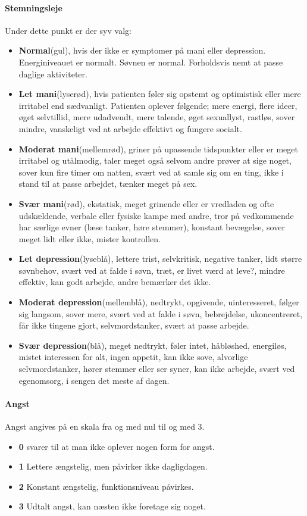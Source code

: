 \paragraph{Stemningsleje}
Under dette punkt er der syv valg:
\begin{itemize}
	\item \textbf{Normal}(gul), hvis der ikke er symptomer på mani eller depression. Energiniveauet er normalt. Søvnen er normal. Forholdsvis nemt at passe daglige aktiviteter.
	\item \textbf{Let mani}(lyserød), hvis patienten føler sig opstemt og optimistisk eller mere irritabel end sædvanligt. Patienten oplever følgende; mere energi, flere ideer, øget selvtillid, mere udadvendt, mere talende, øget sexuallyst, rastløs, sover mindre, vanskeligt ved at arbejde effektivt og fungere socialt.
	\item \textbf{Moderat mani}(mellemrød), griner på upassende tidspunkter eller er meget irritabel og utålmodig, taler meget også selvom andre prøver at sige noget, sover kun fire timer om natten, svært ved at samle sig om en ting, ikke i stand til at passe arbejdet, tænker meget på sex.
	\item \textbf{Svær mani}(rød), ekstatisk, meget grinende eller er vredladen og ofte udskældende, verbale eller fysiske kampe med andre, tror på vedkommende har særlige evner (læse tanker, høre stemmer), konstant bevægelse, sover meget lidt eller ikke, mister kontrollen.
	\item \textbf{Let depression}(lyseblå), lettere trist, selvkritisk, negative tanker, lidt større søvnbehov, svært ved at falde i søvn, træt, er livet værd at leve?, mindre effektiv, kan godt arbejde, andre bemærker det ikke.
	\item \textbf{Moderat depression}(mellemblå), nedtrykt, opgivende, uinteresseret, følger sig langsom, sover mere, svært ved at falde i søvn, bebrejdelse, ukoncentreret, får ikke tingene gjort, selvmordstanker, svært at passe arbejde.
	\item \textbf{Svær depression}(blå), meget nedtrykt, føler intet, håbløshed, energiløs, mistet interessen for alt, ingen appetit, kan ikke sove, alvorlige selvmordstanker, hører stemmer eller ser syner, kan ikke arbejde, svært ved egenomsorg, i sengen det meste af dagen.
\end{itemize}

\paragraph{Angst}
Angst angives på en skala fra og med nul til og med 3.
\begin{itemize}
	\item \textbf{0} svarer til at man ikke oplever nogen form for angst.
	\item \textbf{1} Lettere ængstelig, men påvirker ikke dagligdagen.
	\item \textbf{2} Konstant ængstelig, funktionsniveau påvirkes.
	\item \textbf{3} Udtalt angst, kan næsten ikke foretage sig noget.
\end{itemize}

